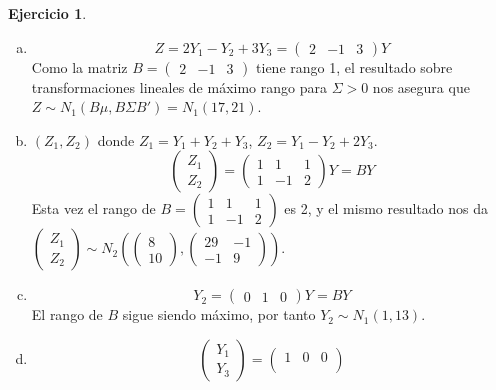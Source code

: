 \documentclass[12pt,spanish]{article}
\theoremstyle{definition}
\newtheorem{exercise}{Ejercicio}
\begin{document}
\begin{exercise}
  \begin{enumerate}[a)]
  \item \[Z=2Y_1-Y_2+3Y_3=
      \begin{pmatrix}
        2 & -1 & 3
      \end{pmatrix}
      Y
    \]
    Como la matriz $B=\begin{pmatrix}
      2 & -1 & 3
    \end{pmatrix}$ tiene rango 1, el resultado sobre
    transformaciones lineales de máximo rango para $\Sigma>0$ nos
    asegura que $Z\sim N_1(B\mu,B\Sigma B')=N_1(17,21)$.
  \item $(Z_1,Z_2)$ donde $Z_1=Y_1+Y_2+Y_3$, $Z_2=Y_1-Y_2+2Y_3$.
    \[\begin{pmatrix}
        Z_1 \\
        Z_2
      \end{pmatrix}
      =\begin{pmatrix}
        1 & 1 & 1 \\
        1 & -1 & 2
      \end{pmatrix}Y=BY
    \]
    Esta vez el rango de $B=\begin{pmatrix}
      1 & 1 & 1 \\
      1 & -1 & 2
    \end{pmatrix}$ es 2, y el mismo resultado nos da \\ $\begin{pmatrix}
      Z_1 \\
      Z_2
    \end{pmatrix}\sim N_2\left(
      \begin{pmatrix}
        8 \\ 10
      \end{pmatrix},
      \begin{pmatrix}
        29 & -1 \\
        -1 & 9
      \end{pmatrix}\right)$.
  \item \[Y_2=
      \begin{pmatrix}
        0 & 1 & 0
      \end{pmatrix}
      Y=BY
    \]
    El rango de $B$ sigue siendo máximo, por tanto $Y_2\sim N_1(1,13)$.
  \item \[\begin{pmatrix}
        Y_1 \\
        Y_3
      \end{pmatrix}
      =\begin{pmatrix}
        1 & 0 & 0 \\

\end{pmatrix}\]
\end{enumerate}
\end{exercise}
\end{document}
